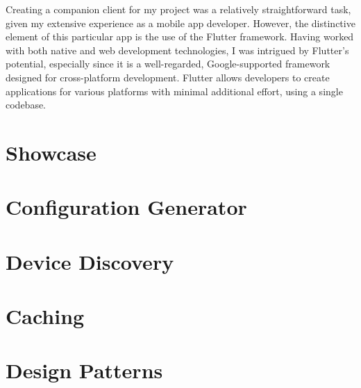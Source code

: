 Creating a companion client for my project was a relatively straightforward task, given my extensive experience as a mobile app developer. However, the distinctive element of this particular app is the use of the Flutter framework. Having worked with both native and web development technologies, I was intrigued by Flutter’s potential, especially since it is a well-regarded, Google-supported framework designed for cross-platform development. Flutter allows developers to create applications for various platforms with minimal additional effort, using a single codebase.

\newpage

\section{Showcase}


\section{Configuration Generator}


\section{Device Discovery}


\section{Caching}


\section{Design Patterns}
